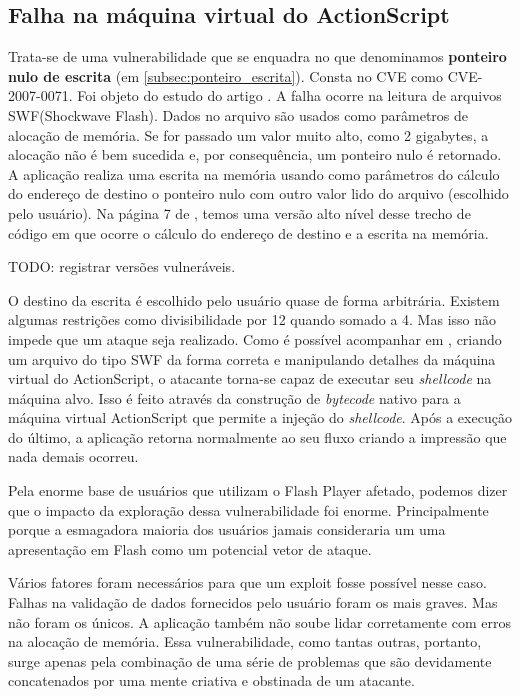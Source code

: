		\subsection{Falha na máquina virtual do ActionScript}
			Trata-se de uma vulnerabilidade que se enquadra no que denominamos \textbf{ponteiro nulo de escrita} (em 
			\ref{subsec:ponteiro_escrita}).
			Consta no CVE como CVE-2007-0071. Foi objeto do estudo do artigo \cite{Dowd2008}.
			A falha ocorre na leitura de arquivos SWF(Shockwave Flash). Dados no arquivo são usados
			como parâmetros de alocação de memória. Se for passado um valor muito alto, como 2 gigabytes,
			a alocação não é bem sucedida e, por consequência, um ponteiro nulo é retornado.
			A aplicação realiza uma escrita na memória usando como parâmetros do cálculo do endereço de destino
			o ponteiro nulo com outro valor lido do arquivo (escolhido pelo usuário).
			Na página 7 de \cite{Dowd2008}, temos uma versão alto nível desse trecho de código
			em que ocorre o cálculo do endereço de destino e a escrita na memória.
			

			TODO: registrar versões vulneráveis.
			

			O destino da escrita é escolhido pelo usuário quase de forma arbitrária. Existem algumas restrições
			como divisibilidade por 12 quando somado a 4. Mas isso não impede que um ataque seja realizado.
			Como é possível acompanhar em \cite{Dowd2008}, criando um arquivo do tipo SWF da forma
			correta e manipulando detalhes da máquina virtual do ActionScript, o atacante torna-se
			capaz de executar seu \textsl{shellcode} na máquina alvo. Isso é feito através da construção
			de \textsl{bytecode} nativo para a máquina virtual ActionScript que permite a injeção do \textsl{shellcode}.
			Após a execução do último, a aplicação retorna normalmente ao seu fluxo criando a impressão que
			nada demais ocorreu.

			
			Pela enorme base de usuários que utilizam o Flash Player afetado, podemos dizer
			que o impacto da exploração dessa vulnerabilidade foi enorme.
			Principalmente porque a esmagadora maioria dos usuários jamais consideraria um
			uma apresentação em Flash como um potencial vetor de ataque.

			
			Vários fatores foram necessários para que um exploit fosse possível nesse caso.
			Falhas na validação de dados fornecidos pelo usuário foram os mais graves.
			Mas não foram os únicos. A aplicação também não soube lidar corretamente com erros
			na alocação de memória. Essa vulnerabilidade, como tantas outras, portanto, surge
			apenas pela combinação de uma série de problemas que são devidamente concatenados
			por uma mente criativa e obstinada de um atacante.
						

